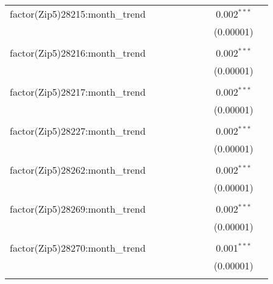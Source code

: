 \begin{table}[H]
{\begin{tabular}{@{\extracolsep{5pt}}lcccccccc}
  factor(Zip5)28215:month\_trend &  &  &  &  &  &  & 0.002$^{***}$ &  \\  

   &  &  &  &  &  &  & (0.00001) &  \\  

   & & & & & & & & \\  

  factor(Zip5)28216:month\_trend &  &  &  &  &  &  & 0.002$^{***}$ &  \\  

   &  &  &  &  &  &  & (0.00001) &  \\  

   & & & & & & & & \\  

  factor(Zip5)28217:month\_trend &  &  &  &  &  &  & 0.002$^{***}$ &  \\  

   &  &  &  &  &  &  & (0.00001) &  \\  

   & & & & & & & & \\  

  factor(Zip5)28227:month\_trend &  &  &  &  &  &  & 0.002$^{***}$ &  \\  

   &  &  &  &  &  &  & (0.00001) &  \\  

   & & & & & & & & \\  

  factor(Zip5)28262:month\_trend &  &  &  &  &  &  & 0.002$^{***}$ &  \\  

   &  &  &  &  &  &  & (0.00001) &  \\  

   & & & & & & & & \\  

  factor(Zip5)28269:month\_trend &  &  &  &  &  &  & 0.002$^{***}$ &  \\  

   &  &  &  &  &  &  & (0.00001) &  \\  

   & & & & & & & & \\  

  factor(Zip5)28270:month\_trend &  &  &  &  &  &  & 0.001$^{***}$ &  \\  

   &  &  &  &  &  &  & (0.00001) &  \\  

   & & & & & & & & \\  


\end{tabular}}
\end{table}
